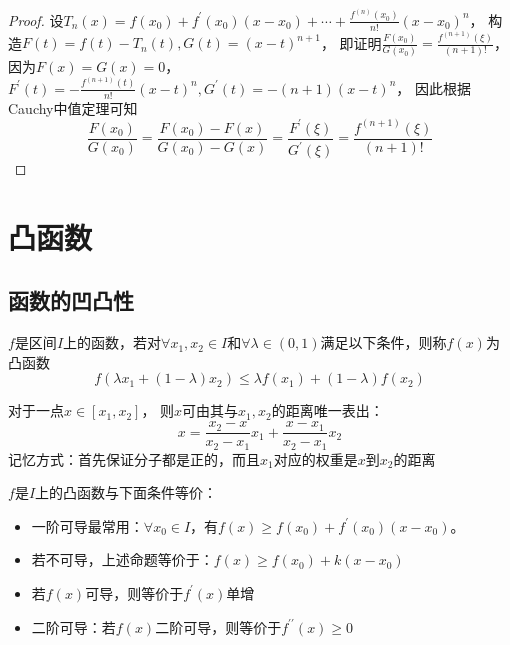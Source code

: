 \begin{proof}
  设$T_n(x) = f(x_0) + f^{\prime}(x_0)(x - x_0) + \cdots + \frac{f^{(n)}(x_0)}{n!}(x - x_0)^n$，
  构造$F(t) = f(t) - T_n(t), G(t) = (x - t)^{n+1}$，
  即证明$\frac{F(x_0)}{G(x_0)} = \frac{f^{(n+1)}(\xi)}{(n+1)!}$，
  因为$F(x) = G(x) = 0$，
  $F^{\prime}(t) = - \frac{f^{(n+1)}(t)}{n!}(x - t)^n, G^{\prime}(t) = -(n+1)(x - t)^n$，
  因此根据Cauchy中值定理可知
  \begin{equation*}
    \frac{F(x_0)}{G(x_0)} = \frac{F(x_0) - F(x)}{G(x_0) - G(x)} = \frac{F^{\prime}(\xi)}{G^{\prime}(\xi)} = \frac{f^{(n+1)}(\xi)}{(n+1)!}
  \end{equation*}
\end{proof}





\section{凸函数}

\subsection{函数的凹凸性}

\begin{definition}[凸函数]
  $f$是区间$I$上的函数，若对$\forall x_1,x_2 \in I$和$\forall \lambda \in (0,1)$满足以下条件，则称$f(x)$为凸函数
  \begin{equation*}
    f(\lambda x_1 + (1 - \lambda)x_2) \leq \lambda f(x_1) + (1 - \lambda)f(x_2)
  \end{equation*}
\end{definition}

\begin{lemma}[定比分点公式]
  对于一点$x \in [x_1,x_2]$，
  则$x$可由其与$x_1,x_2$的距离唯一表出：
  \begin{equation*}
    x = \frac{x_2 - x}{x_2 - x_1}x_1 + \frac{x - x_1}{x_2 - x_1}x_2
  \end{equation*}
  记忆方式：首先保证分子都是正的，而且$x_1$对应的权重是$x$到$x_2$的距离
\end{lemma}

\begin{theorem}[凸函数的等价条件]
  $f$是$I$上的凸函数与下面条件等价：
  \begin{itemize}
  \item 一阶可导最常用：$\forall x_0 \in I$，有$f(x) \geq f(x_0) + f^{\prime}(x_0)(x - x_0)$。
  \item 若不可导，上述命题等价于：$f(x) \geq f(x_0) + k (x - x_0)$
  \item 若$f(x)$可导，则等价于$f^{\prime}(x)$单增
  \item 二阶可导：若$f(x)$二阶可导，则等价于$f^{\prime\prime}(x) \geq 0$
  \end{itemize}
\end{theorem}

